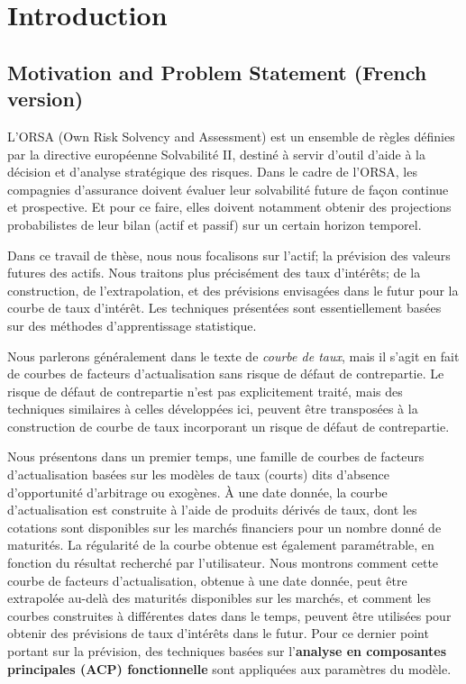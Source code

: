 %

\chapter{Introduction}
\label{sec:intro}

\section{Motivation and Problem Statement (French version)}

L'ORSA (Own Risk Solvency and Assessment) est un ensemble de règles définies par la directive européenne Solvabilit\'e II, destiné à servir d'outil d'aide à la décision et d'analyse stratégique des risques. Dans le cadre de l'ORSA, les compagnies d'assurance doivent évaluer leur solvabilité future de façon continue et prospective. Et pour ce faire, elles doivent notamment obtenir des projections probabilistes de leur bilan (actif et passif) sur un certain horizon temporel.   

Dans ce travail de thèse, nous nous focalisons sur l'actif; la prévision des valeurs futures des actifs. Nous traitons plus précisément des taux d'intérêts; de la construction, de l'extrapolation, et des prévisions envisagées dans le futur pour la courbe de taux d'intérêt. Les techniques présentées sont essentiellement basées sur des méthodes d'apprentissage statistique.    

Nous parlerons généralement dans le texte de \textit{courbe de taux}, mais il s'agit en fait  de courbes de facteurs d'actualisation sans risque de défaut de contrepartie. Le risque de défaut de contrepartie n'est pas explicitement traité, mais des techniques similaires à celles développées ici, peuvent être transposées à la construction de courbe de taux incorporant un risque de défaut de contrepartie.

Nous présentons dans un premier temps, une famille de courbes de facteurs d'actualisation basées sur les modèles de taux (courts) dits d'absence d'opportunité d'arbitrage ou exogènes. À une date donnée, la courbe d'actualisation est construite à l'aide de produits dérivés de taux, dont les cotations sont disponibles sur les marchés financiers pour un nombre donné de maturités. La régularité de la courbe obtenue est également paramétrable, en fonction du résultat recherché par l'utilisateur. Nous montrons comment cette courbe de facteurs d'actualisation, obtenue à une date donnée, peut être extrapolée au-delà des maturités disponibles sur les marchés, et comment les courbes construites à différentes dates dans le temps, peuvent être utilisées pour obtenir des prévisions de taux d'intérêts dans le futur.  Pour ce dernier point portant sur la prévision, des techniques basées sur l'\textbf{analyse en composantes principales (ACP) fonctionnelle} sont appliquées aux paramètres du modèle. 

